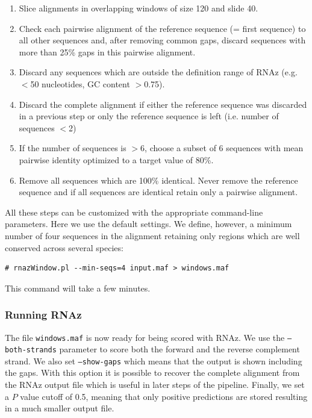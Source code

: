 \documentclass[11pt]{article}
\begin{document}
\begin{enumerate}

\item Slice alignments in overlapping windows of size 120 and slide 40.
\item Check each pairwise alignment of the reference sequence (= first
  sequence) to all other sequences and, after removing common gaps, discard
  sequences with more than 25\% gaps in this pairwise alignment.
\item Discard any sequences which are outside the definition range of
  RNAz (e.g. $<$50 nucleotides, GC content $>$0.75). 
\item Discard the complete alignment if either the reference sequence was
  discarded in a previous step or only the reference sequence is left (i.e.
  number of sequences $<$2)
\item If the number of sequences is $>$6, choose a subset of 6 sequences
  with mean pairwise identity optimized to a target value of 80\%.
\item Remove all sequences which are 100\% identical. Never remove the
  reference sequence and if all sequences are identical retain only a
  pairwise alignment.

\end{enumerate}

All these steps can be customized with the appropriate command-line
parameters. Here we use the default settings. We define, however, a minimum
number of four sequences in the alignment retaining only regions which are
well conserved across several species:

\begin{verbatim}
# rnazWindow.pl --min-seqs=4 input.maf > windows.maf
\end{verbatim}

This command will take a few minutes.

\subsubsection{Running RNAz}

The file \texttt{windows.maf} is now ready for being scored with RNAz. We
use the \texttt{--both-strands} parameter to score both the forward and the
reverse complement strand. We also set \texttt{--show-gaps} which means
that the output is shown including the gaps. With this option it is
possible to recover the complete alignment from the RNAz output file which
is useful in later steps of the pipeline. Finally, we set a $P$ value
cutoff of 0.5, meaning that only positive predictions are stored resulting
in a much smaller output file.
\end{document}
